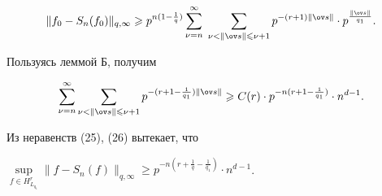 \begin{pf}
\begin{equation}
\|f_{0}-S_{n}(f_{0})\|_{q,\infty}\geq p^{n(1-\frac{1}{q})} 


\sum_{\nu=n}^{\infty}\;\sum_{\nu<\|\ov s\|\leq\nu+1}


p^{-(r+1)\|\ov s\|}\cdot p^{\frac{\|\ov s\|}{q_{1}}}.


\end{equation}


Пользуясь леммой Б, получим 


\begin{equation}


\sum_{\nu=n}^{\infty}\sum_{\nu<\|\ov s\|\leq\nu+1} 


p^{-(r+1-\frac{1}{q_{1}})\|\ov s\|}\geq 


C(r)\cdot p^{-n(r+1-\frac{1}{q_{1}})}\cdot n^{d-1}.


\end{equation}


Из неравенств (25), (26) вытекает, что


$\sup\limits_{f\in H_{L_{q_{1}}}^{r}}\|f-S_{n}(f)\|_{q,\infty}\geq 


p^{-n(r+\frac{1}{q}-\frac{1}{q_{1}})}\cdot n^{d-1}$.


\end{pf}








